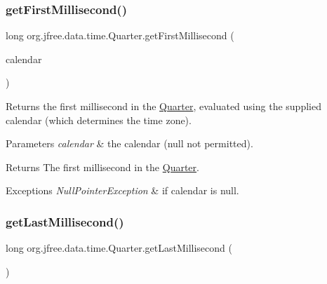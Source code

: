 \subsubsection{\texorpdfstring{get\+First\+Millisecond()}{getFirstMillisecond()}\hspace{0.1cm}{\footnotesize\ttfamily [2/2]}}
{\footnotesize\ttfamily long org.\+jfree.\+data.\+time.\+Quarter.\+get\+First\+Millisecond (\begin{DoxyParamCaption}\item[{Calendar}]{calendar }\end{DoxyParamCaption})}

Returns the first millisecond in the \mbox{\hyperlink{classorg_1_1jfree_1_1data_1_1time_1_1_quarter}{Quarter}}, evaluated using the supplied calendar (which determines the time zone).


\begin{DoxyParams}{Parameters}
{\em calendar} & the calendar ({\ttfamily null} not permitted).\\
\hline
\end{DoxyParams}
\begin{DoxyReturn}{Returns}
The first millisecond in the \mbox{\hyperlink{classorg_1_1jfree_1_1data_1_1time_1_1_quarter}{Quarter}}.
\end{DoxyReturn}

\begin{DoxyExceptions}{Exceptions}
{\em Null\+Pointer\+Exception} & if {\ttfamily calendar} is {\ttfamily null}. \\
\hline
\end{DoxyExceptions}
\mbox{\label{classorg_1_1jfree_1_1data_1_1time_1_1_quarter_afa9df1dbf9d13ab199ad78d6cc222f62}} 
\subsubsection{\texorpdfstring{get\+Last\+Millisecond()}{getLastMillisecond()}\hspace{0.1cm}{\footnotesize\ttfamily [1/2]}}
{\footnotesize\ttfamily long org.\+jfree.\+data.\+time.\+Quarter.\+get\+Last\+Millisecond (\begin{DoxyParamCaption}{ }\end{DoxyParamCaption})}

